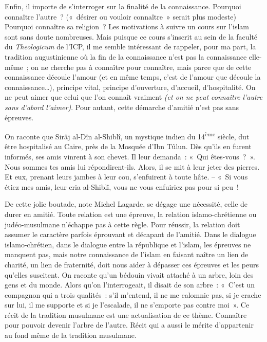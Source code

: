 Enfin, il importe de s'interroger sur la finalité de la connaissance.
Pourquoi connaître l'autre~? («~désirer ou vouloir connaître~» serait
plus modeste) Pourquoi connaître sa religion~? Les motivations à suivre
un cours sur l'islam sont sans doute nombreuses. Mais puisque ce cours
s'inscrit au sein de la faculté du \emph{Theologicum} de l'ICP, il me
semble intéressant de rappeler, pour ma part, la tradition augustinienne
où la fin de la connaissance n'est pas la connaissance elle-même~; on ne
cherche pas à connaître pour connaître, mais parce que de cette
connaissance découle l'amour (et en même temps, c'est de l'amour que
découle la connaissance\ldots), principe vital, principe d'ouverture,
d'accueil, d'hospitalité. On ne peut aimer que celui que l'on connaît
vraiment \emph{(et on ne peut connaître l'autre sans d'abord l'aimer)}.
Pour autant, cette démarche d'amitié n'est pas sans épreuves.

On raconte que Sirâj al-Dîn al-Shiblî, un mystique indien du
14\textsuperscript{ème} siècle, dut être hospitalisé au Caire, près de
la Mosquée d'Ibn Tûlun. Dès qu'ils en furent informés, ses amis vinrent
à son chevet. Il leur demanda~: «~Qui êtes-vous~?~». Nous sommes tes
amis lui répondirent-ils. Alors, il se mit à leur jeter des pierres. Et
eux, prenant leurs jambes à leur cou, s'enfuirent à toute hâte. -- «~Si
vous étiez mes amis, leur cria al-Shiblî, vous ne vous enfuiriez pas
pour si peu~!~

De cette jolie boutade, note Michel Lagarde, se dégage une nécessité,
celle de durer en amitié. Toute relation est une épreuve, la relation
islamo-chrétienne ou judéo-musulmane n'échappe pas à cette règle. Pour
réussir, la relation doit assumer le caractère parfois éprouvant et
décapant de l'amitié. Dans le dialogue islamo-chrétien, dans le dialogue
entre la république et l'islam, les épreuves ne manquent pas, mais notre
connaissance de l'islam en faisant naître un lien de charité, un lien de
fraternité, doit nous aider à dépasser ces épreuves et les peurs
qu'elles suscitent. On raconte qu'un bédouin vivait attaché à un arbre,
loin des gens et du monde. Alors qu'on l'interrogeait, il disait de son
arbre~: «~C'est un compagnon qui a trois qualités~: s'il m'entend, il ne
me calomnie pas, si je crache sur lui, il me supporte et si je
l'escalade, il ne s'emporte pas contre moi~». Ce récit de la tradition musulmane est
une actualisation de ce thème. Connaître pour pouvoir devenir l'arbre de
l'autre. Récit qui a aussi le mérite d'appartenir au fond même de la
tradition musulmane.

